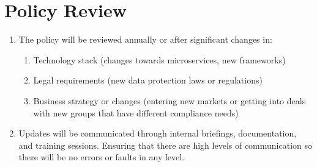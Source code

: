\section{Policy Review}
\begin{enumerate}
    \item The policy will be reviewed annually or after significant changes in:
    \begin{enumerate}
        \item Technology stack (changes towards microservices, new frameworks)
        \item Legal requirements (new data protection laws or regulations)
        \item Business strategy or changes  (entering new markets or getting into deals with new groups that have different compliance needs)
    \end{enumerate}
    \item Updates will be communicated through internal briefings, documentation, and training sessions. Ensuring that there are high levels of communication so there will be no errors or faults in any level. 
\end{enumerate}
